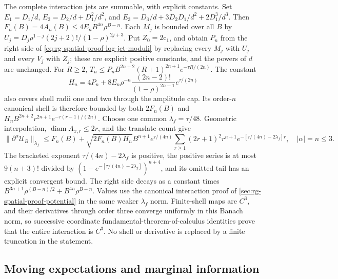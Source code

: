 The complete interaction jets are summable, with explicit constants. Set
\(E_1=D_1/d\), \(E_2=D_2/d+D_1^2/d^2\), and
\(E_3=D_3/d+3D_2D_1/d^2+2D_1^3/d^3\). Then
\(F_n(B)=4A_n(B)\le4E_nB^{4n}\rho^{B-n}\). Each \(M_j\) is bounded over all
\(B\) by \(U_j=D_j\rho^{1-j}(2j+2)!/(1-\rho)^{2j+3}\). Put
\(Z_0=2\mathrm c_1\), and obtain \(P_n\) from the right side of
\cref{eq:rg-spatial-proof-log-jet-moduli} by replacing every \(M_j\) with
\(U_j\) and every \(V_j\) with \(Z_j\); these are explicit positive
constants, and the powers of \(d\) are unchanged. For \(R\ge2\),
\(T_n\le P_nB^{2n+2}(R+1)^{2n+1}e^{-\tau R/(2n)}\). The constant
\begin{equation}
 H_n=4P_n+
 8E_n\rho^{-n}\frac{(2n-2)!}{(1-\rho)^{2n-1}}e^{\tau/(2n)}
 \label{eq:rg-spatial-proof-jet-shell-constant}
\end{equation}
also covers shell radii one and two through the amplitude cap. Its
order-\(n\) canonical shell is therefore bounded by both \(2F_n(B)\) and
\(H_nB^{2n+2}r^{2n+1}e^{-\tau(r-1)/(2n)}\). Choose one common
\(\lambda_f=\tau/48\). Geometric interpolation,
\(\operatorname{diam}A_{x,r}\le2r\), and the translate count give
\begin{equation}
 \|\partial^\alpha\mathscr U_B\|_{\lambda_f}
 \le F_n(B)+\sqrt{2F_n(B)H_n}B^{n+1}e^{\tau/(4n)}
       \sum_{r\ge1}(2r+1)^2r^{n+1}
          e^{-[\tau/(4n)-2\lambda_f]r},\quad |\alpha|=n\le3.
 \label{eq:rg-spatial-proof-complete-jet-norm}
\end{equation}
The bracketed exponent \(\tau/(4n)-2\lambda_f\) is positive, the positive
series is at most \(9(n+3)!\) divided by
\((1-e^{-[\tau/(4n)-2\lambda_f]})^{n+4}\), and its omitted tail has an
explicit convergent bound. The right side decays as a constant times
\(B^{3n+1}\rho^{(B-n)/2}+B^{4n}\rho^{B-n}\). Values use the canonical
interaction proof of \cref{sec:rg-spatial-proof-potential} in the same
weaker \(\lambda_f\) norm. Finite-shell maps are \(C^3\), and their
derivatives through order three converge uniformly in this Banach norm, so
successive coordinate fundamental-theorem-of-calculus identities prove that
the entire interaction is \(C^3\). No shell or derivative is replaced by a
finite truncation in the statement.

\subsection{Moving expectations and marginal information}
\label{sec:rg-spatial-proof-moving-fisher}

